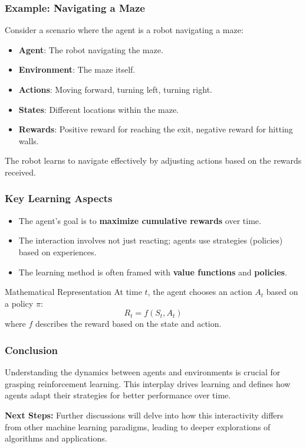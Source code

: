 \documentclass[aspectratio=169]{beamer}
\begin{document}
\begin{frame}[fragile]
    \frametitle{Example: Navigating a Maze}
    
    Consider a scenario where the agent is a robot navigating a maze:
    
    \begin{itemize}
        \item \textbf{Agent}: The robot navigating the maze.
        \item \textbf{Environment}: The maze itself.
        \item \textbf{Actions}: Moving forward, turning left, turning right.
        \item \textbf{States}: Different locations within the maze.
        \item \textbf{Rewards}: Positive reward for reaching the exit, negative reward for hitting walls.
    \end{itemize}
    
    The robot learns to navigate effectively by adjusting actions based on the rewards received.
\end{frame}

\begin{frame}[fragile]
    \frametitle{Key Learning Aspects}
    
    \begin{itemize}
        \item The agent's goal is to \textbf{maximize cumulative rewards} over time.
        \item The interaction involves not just reacting; agents use strategies (policies) based on experiences.
        \item The learning method is often framed with \textbf{value functions} and \textbf{policies}.
    \end{itemize}

    \begin{block}{Mathematical Representation}
        At time \(t\), the agent chooses an action \(A_t\) based on a policy \(\pi\):
        \[
        R_t = f(S_t, A_t)
        \]
        where \(f\) describes the reward based on the state and action.
    \end{block}
\end{frame}

\begin{frame}[fragile]
    \frametitle{Conclusion}
    
    Understanding the dynamics between agents and environments is crucial for grasping reinforcement learning. This interplay drives learning and defines how agents adapt their strategies for better performance over time.
    
    \textbf{Next Steps:}
    Further discussions will delve into how this interactivity differs from other machine learning paradigms, leading to deeper explorations of algorithms and applications.
\end{frame}
\end{document}
